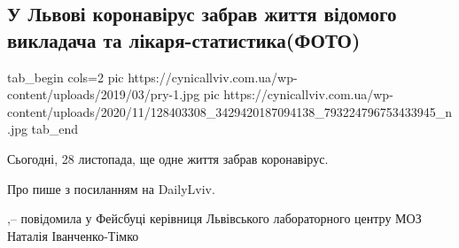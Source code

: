  
 
 
 
 
 
\subsection{У Львові коронавірус забрав життя відомого викладача та лікаря-статистика(ФОТО)}
\label{sec:28_11_2020.news.ua.cynicallviv.2.death_covid}

\ifcmt
tab_begin cols=2
	pic https://cynicallviv.com.ua/wp-content/uploads/2019/03/pry-1.jpg
	pic https://cynicallviv.com.ua/wp-content/uploads/2020/11/128403308_3429420187094138_793224796753433945_n.jpg 
tab_end
\fi

Сьогодні, 28 листопада, ще одне життя забрав коронавірус.

Про пише  з посиланням на  DailyLviv.

,–  повідомила у
Фейсбуці керівниця Львівського лабораторного центру МОЗ Наталія Іванченко-Тімко
